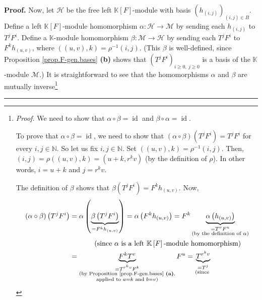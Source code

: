 \documentclass[numbers=enddot,12pt,final,onecolumn,notitlepage]{scrartcl}%
\theoremstyle{definition}
\newenvironment{proof}[1][Proof]{\noindent\textbf{#1.} }{\ \rule{0.5em}{0.5em}}
\begin{document}
\begin{proof}
Now, let $\mathcal{H}$ be the free left $\mathbb{K}\left[  F\right]  $-module
with basis $\left(  h_{\left(  i,j\right)  }\right)  _{\left(  i,j\right)  \in
B}$. Define a left $\mathbb{K}\left[  F\right]  $-module homomorphism
$\alpha:\mathcal{H}\rightarrow\mathcal{M}$ by sending each $h_{\left(
i,j\right)  }$ to $T^{j}F^{i}$. Define a $\mathbb{K}$-module homomorphism
$\beta:\mathcal{M}\rightarrow\mathcal{H}$ by sending each $T^{j}F^{i}$ to
$F^{k}h_{\left(  u,v\right)  }$, where $\left(  \left(  u,v\right)  ,k\right)
=\rho^{-1}\left(  i,j\right)  $. (This $\beta$ is well-defined, since
Proposition \ref{prop.F-gen.bases} \textbf{(b)} shows that $\left(  T^{j}%
F^{i}\right)  _{i\geq0,\ j\geq0}$ is a basis of the $\mathbb{K}$-module
$\mathcal{M}$.) It is straightforward to see that the homomorphisms $\alpha$
and $\beta$ are mutually inverse\footnote{\textit{Proof.} We need to show that
$\alpha\circ\beta=\operatorname*{id}$ and $\beta\circ\alpha=\operatorname*{id}%
$.
\par
To prove that $\alpha\circ\beta=\operatorname*{id}$, we need to show that
$\left(  \alpha\circ\beta\right)  \left(  T^{j}F^{i}\right)  =T^{j}F^{i}$ for
every $i,j\in\mathbb{N}$. So let us fix $i,j\in\mathbb{N}$. Set $\left(
\left(  u,v\right)  ,k\right)  =\rho^{-1}\left(  i,j\right)  $. Then, $\left(
i,j\right)  =\rho\left(  \left(  u,v\right)  ,k\right)  =\left(
u+k,r^{k}v\right)  $ (by the definition of $\rho$). In other words, $i=u+k$
and $j=r^{k}v$.
\par
The definition of $\beta$ shows that $\beta\left(  T^{j}F^{i}\right)
=F^{k}h_{\left(  u,v\right)  }$. Now,%
\begin{align*}
\left(  \alpha\circ\beta\right)  \left(  T^{j}F^{i}\right)   &  =\alpha\left(
\underbrace{\beta\left(  T^{j}F^{i}\right)  }_{=F^{k}h_{\left(  u,v\right)  }%
}\right)  =\alpha\left(  F^{k}h_{\left(  u,v\right)  }\right)  =F^{k}%
\underbrace{\alpha\left(  h_{\left(  u,v\right)  }\right)  }_{\substack{=T^{v}%
F^{u}\\\text{(by the definition of }\alpha\text{)}}}\\
&  \ \ \ \ \ \ \ \ \ \ \left(  \text{since }\alpha\text{ is a left }%
\mathbb{K}\left[  F\right]  \text{-module homomorphism}\right) \\
&  =\underbrace{F^{k}T^{v}}_{\substack{=T^{r^{k}v}F^{k}\\\text{(by Proposition
\ref{prop.F-gen.bases} \textbf{(a)},}\\\text{applied to }a=k\text{ and
}b=v\text{)}}}F^{u}=\underbrace{T^{r^{k}v}}_{\substack{=T^{j}\\\text{(since
}}}
\end{align*}}
\end{proof}
\end{document}
